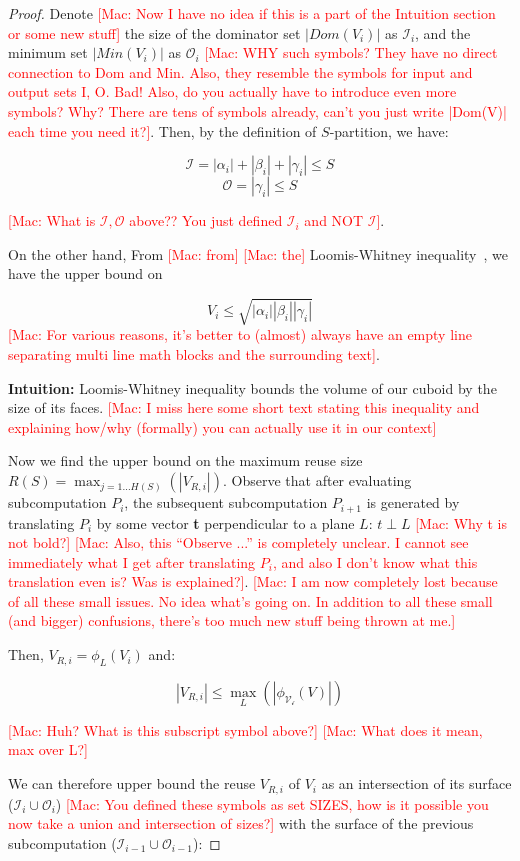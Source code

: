 \documentclass[sigplan,review,anonymous]{acmart}\settopmatter{printfolios=true,printccs=false,printacmref=false}
\newcommand\mac[1]{\textcolor{red}{[Mac: #1]}}
\begin{document}
\begin{proof}
Denote \mac{Now I have no idea if this is a part of the Intuition section or
some new stuff} the size of the dominator set $|Dom(V_i)|$ as $\mathcal{I}_i$,
and the minimum set $|Min(V_i)|$ as $\mathcal{O}_i$ \mac{WHY such symbols? They
have no direct connection to Dom and Min. Also, they resemble the symbols for
input and output sets I, O. Bad!  Also, do you actually have to introduce even
more symbols? Why? There are tens of symbols already, can't you just write
|Dom(V)| each time you need it?}.  Then, by the definition of $S$-partition, we
have:

$$\mathcal{I} = |\alpha_i| + |\beta_i| + |\gamma_i| \le S$$
$$\mathcal{O} = |\gamma_i| \le S$$

\mac{What is $\mathcal{I}, \mathcal{O}$ above?? You just defined $\mathcal{I}_i$ and NOT
$\mathcal{I}$}.

On the other hand, From \mac{from} \mac{the} Loomis-Whitney
inequality~\cite{loomisWhitney}, we have the upper bound on 

$$V_i \le \sqrt{|\alpha_i| |\beta_i| |\gamma_i|}$$ \mac{For various reasons,
it's better to (almost) always have an empty line separating multi line math
blocks and the surrounding text}.

\textbf{Intuition:} Loomis-Whitney inequality bounds the volume of our cuboid
by the size of its faces.  \mac{I miss here some short text stating this
inequality and explaining how/why (formally) you can actually use it in our
context}

Now we find the upper bound on the maximum reuse size $R(S) = \max_{j = 1 \dots
H(S)}(|V_{R,i}|)$. Observe that after evaluating subcomputation $P_i$, the
subsequent subcomputation $P_{i+1}$ is generated by translating $P_i$ by some
vector \textbf{t} perpendicular to a plane $L$: $t \perp L$ \mac{Why t is not
bold?} \mac{Also, this ``Observe ...'' is completely unclear.  I cannot see
immediately what I get after translating $P_i$, and also I don't know what this
translation even is? Was is explained?}.  \mac{I am now completely lost because
of all these small issues. No idea what's going on.  In addition to all these
small (and bigger) confusions, there's too much new stuff being thrown at me.}

Then, $V_{R,i} = \phi_L(V_i)$ and:

$$|V_{R,i}| \le \max_L(|\phi_\mathcal{V_i}(V)|)$$

\mac{Huh? What is this subscript symbol above?}
\mac{What does it mean, max over L?}

We can therefore upper bound the reuse $V_{R,i}$ of $V_i$ as an intersection of
its surface ($\mathcal{I}_i \cup \mathcal{O}_i$) \mac{You defined these symbols
as set SIZES, how is it possible you now take a union and intersection of
sizes?} with the surface of the previous subcomputation ($\mathcal{I}_{i-1}
\cup \mathcal{O}_{i-1}$):


\end{proof}
\end{document}
